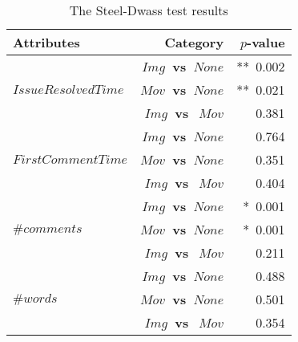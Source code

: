\begin{table}[t]
  \begin{center}
  \caption{The Steel-Dwass test results }
  \begin{tabular}{l r|r}
    \toprule
    Attributes & Category & $p$-value\\
    \midrule
     & \bf{$Img$~vs~$None$} & **~0.002 \\
     $IssueResolvedTime$ & \bf{$Mov$~vs~$None$} & **~0.021 \\
     & \bf{$Img$~vs~$~Mov$} & 0.381 \\
    \midrule
     & \bf{$Img$~vs~$None$} & 0.764 \\
     $FirstCommentTime$ & \bf{$Mov$~vs~$None$} & 0.351 \\
     & \bf{$Img$~vs~$~Mov$} & 0.404 \\
    \midrule
     & \bf{$Img$~vs~$None$} & *~0.001 \\
     $\#comments$ & \bf{$Mov$~vs~$None$} & *~0.001 \\
     & \bf{$Img$~vs~$~Mov$} & 0.211 \\
    \midrule
     & \bf{$Img$~vs~$None$} & 0.488 \\
     $\#words$  & \bf{$Mov$~vs~$None$} & 0.501 \\
     & \bf{$Img$~vs~$~Mov$} & 0.354 \\
    \bottomrule
  \end{tabular}\\
  \label{tab:Steel-Dwass-test}
  \end{center}
\end{table}